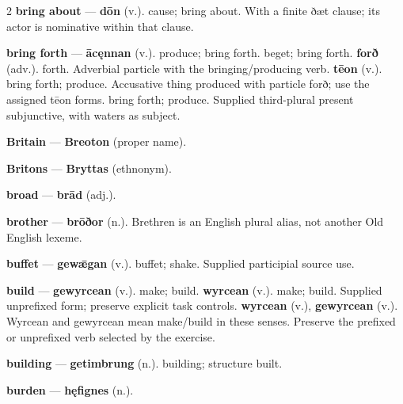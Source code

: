 \begin{multicols}{2}
\textbf{bring about} — \textbf{dōn} (v.). cause; bring about. With a finite ðæt clause; its actor is nominative within that clause.\par
\textbf{bring forth} — \textbf{ācęnnan} (v.). produce; bring forth. beget; bring forth. \textbf{forð} (adv.). forth. Adverbial particle with the bringing/producing verb. \textbf{tēon} (v.). bring forth; produce. Accusative thing produced with particle forð; use the assigned tēon forms. bring forth; produce. Supplied third-plural present subjunctive, with waters as subject.\par
\textbf{Britain} — \textbf{Breoton} (proper name).\par
\textbf{Britons} — \textbf{Bryttas} (ethnonym).\par
\textbf{broad} — \textbf{brād} (adj.).\par
\textbf{brother} — \textbf{brōðor} (n.). Brethren is an English plural alias, not another Old English lexeme.\par
\textbf{buffet} — \textbf{gewǣgan} (v.). buffet; shake. Supplied participial source use.\par
\textbf{build} — \textbf{gewyrcean} (v.). make; build. \textbf{wyrcean} (v.). make; build. Supplied unprefixed form; preserve explicit task controls. \textbf{wyrcean} (v.), \textbf{gewyrcean} (v.). Wyrcean and gewyrcean mean make/build in these senses. Preserve the prefixed or unprefixed verb selected by the exercise.\par
\textbf{building} — \textbf{getimbrung} (n.). building; structure built.\par
\textbf{burden} — \textbf{hęfignes} (n.).\par

\end{multicols}

